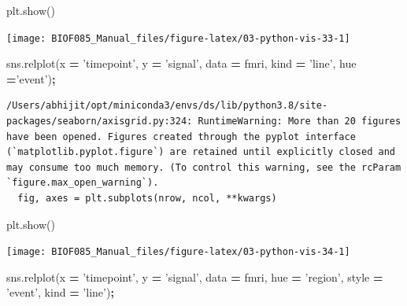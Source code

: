 \documentclass[
  letterpaper,
]{scrbook}
\newenvironment{Shaded}{\begin{snugshade}}{\end{snugshade}}
\newcommand{\NormalTok}[1]{#1}
\newcommand{\OperatorTok}[1]{\textcolor[rgb]{0.81,0.36,0.00}{\textbf{#1}}}
\newcommand{\StringTok}[1]{\textcolor[rgb]{0.31,0.60,0.02}{#1}}
\begin{document}
\begin{Shaded}
\begin{Highlighting}[]
\NormalTok{plt.show()}
\end{Highlighting}
\end{Shaded}

\begin{center}\texttt{[image: BIOF085\_Manual\_files/figure-latex/03-python-vis-33-1]} \end{center}

\begin{Shaded}
\begin{Highlighting}[]
\NormalTok{sns.relplot(x }\OperatorTok{=} \StringTok{'timepoint'}\NormalTok{, y }\OperatorTok{=} \StringTok{'signal'}\NormalTok{, data }\OperatorTok{=}\NormalTok{ fmri, kind }\OperatorTok{=} \StringTok{'line'}\NormalTok{, hue }\OperatorTok{=}\StringTok{'event'}\NormalTok{)}\OperatorTok{;}
\end{Highlighting}
\end{Shaded}

\begin{verbatim}
/Users/abhijit/opt/miniconda3/envs/ds/lib/python3.8/site-packages/seaborn/axisgrid.py:324: RuntimeWarning: More than 20 figures have been opened. Figures created through the pyplot interface (`matplotlib.pyplot.figure`) are retained until explicitly closed and may consume too much memory. (To control this warning, see the rcParam `figure.max_open_warning`).
  fig, axes = plt.subplots(nrow, ncol, **kwargs)
\end{verbatim}

\begin{Shaded}
\begin{Highlighting}[]
\NormalTok{plt.show()}
\end{Highlighting}
\end{Shaded}

\begin{center}\texttt{[image: BIOF085\_Manual\_files/figure-latex/03-python-vis-34-1]} \end{center}

\begin{Shaded}
\begin{Highlighting}[]
\NormalTok{sns.relplot(x }\OperatorTok{=} \StringTok{'timepoint'}\NormalTok{, y }\OperatorTok{=} \StringTok{'signal'}\NormalTok{, data }\OperatorTok{=}\NormalTok{ fmri, hue }\OperatorTok{=} \StringTok{'region'}\NormalTok{, }
\NormalTok{            style }\OperatorTok{=} \StringTok{'event'}\NormalTok{, kind }\OperatorTok{=} \StringTok{'line'}\NormalTok{)}\OperatorTok{;}
\end{Highlighting}
\end{Shaded}
\end{document}
